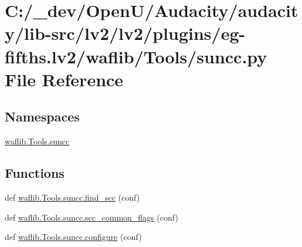 \hypertarget{lv2_2plugins_2eg-fifths_8lv2_2waflib_2_tools_2suncc_8py}{}\section{C\+:/\+\_\+dev/\+Open\+U/\+Audacity/audacity/lib-\/src/lv2/lv2/plugins/eg-\/fifths.lv2/waflib/\+Tools/suncc.py File Reference}
\label{lv2_2plugins_2eg-fifths_8lv2_2waflib_2_tools_2suncc_8py}
\subsection*{Namespaces}
\begin{DoxyCompactItemize}
\item 
 \hyperlink{namespacewaflib_1_1_tools_1_1suncc}{waflib.\+Tools.\+suncc}
\end{DoxyCompactItemize}
\subsection*{Functions}
\begin{DoxyCompactItemize}
\item 
def \hyperlink{namespacewaflib_1_1_tools_1_1suncc_a810240f3b4d36933a366acad20a2d809}{waflib.\+Tools.\+suncc.\+find\+\_\+scc} (conf)
\item 
def \hyperlink{namespacewaflib_1_1_tools_1_1suncc_a783044dc96ae339c6feba5c8dbb9c95e}{waflib.\+Tools.\+suncc.\+scc\+\_\+common\+\_\+flags} (conf)
\item 
def \hyperlink{namespacewaflib_1_1_tools_1_1suncc_ae6f8e7665e3dfa76f606cbe655d4faf9}{waflib.\+Tools.\+suncc.\+configure} (conf)
\end{DoxyCompactItemize}
